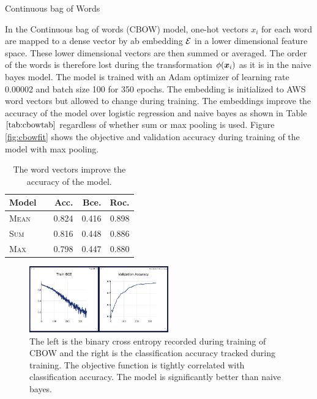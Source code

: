 \documentclass[11pt]{article}
\begin{document}
\begin{subsection}{Continuous bag of Words}

In the Continuous bag of words (CBOW) model, one-hot vectors $x_i$ for each word are mapped to a dense vector by ab embedding $\mathcal{E}$ in a lower dimensional feature space. These lower dimensional vectors are then summed or averaged. The order of the words is therefore lost during the transformation $\phi(\boldsymbol{x}_i)$ as it is in the naive bayes model. The model is trained with an Adam optimizer of learning rate 0.00002 and batch size 100 for 350 epochs. The embedding is initialized to AWS word vectors but allowed to change during training. The embeddings improve the accuracy of the model over logistic regression and naive bayes as shown in Table $\ref{tab:cbowtab}$ regardless of whether sum or max pooling is used. Figure \ref{fig:cbowfit} shows the objective and validation accuracy during training of the model with max pooling.

\begin{table}[h]
\centering
\begin{tabular}{llrrr}
 \toprule
 Model &  & Acc. & Bce. & Roc.\\
 \midrule
 \textsc{Mean} & & 0.824 & 0.416 & 0.898\\
 \textsc{Sum} & & 0.816  & 0.448 & 0.886\\
  \textsc{Max} & & 0.798  & 0.447 & 0.880\\
 \bottomrule
\end{tabular}
\caption{\label{tab:cbowtab} The word vectors improve the accuracy of the model.}
\end{table}

\begin{figure}
  \centering
  \includegraphics[width=6cm]{imgs/cbowtrain}
  \caption{\label{fig:logtrain} The left is the binary cross entropy recorded during training of CBOW and the right is the classification accuracy tracked during training. The objective function is tightly correlated with classification accuracy. The model is significantly better than naive bayes.}
\end{figure}

\end{subsection}
\end{document}
